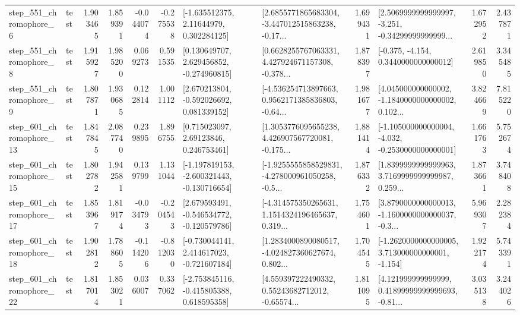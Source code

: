 \begin{tabular}{llrrrrllrlrr}
   step\_551\_chromophore\_6 &      test &      1.903465 &    1.859391 &     -0.044074 & -0.275538 &     [-1.635512375, 2.11644979, 0.302284125] &  [2.6855771865683304, -3.447012515863238, -0.17... &       1.699431 &  [2.5069999999999997, -3.251, -0.34299999999999... &            1.672952 &          2.437871 \\
   step\_551\_chromophore\_8 &      test &      1.915927 &    1.985200 &      0.069273 &  0.591535 &    [0.130649707, 2.629456852, -0.274960815] &  [0.6628255767063331, 4.427924671157308, -0.378... &       1.878397 &               [-0.375, -4.154, 0.3440000000000012] &            2.619850 &          3.345485 \\
   step\_551\_chromophore\_9 &      test &      1.807871 &    1.930685 &      0.122814 &  1.001112 &    [2.670213804, -0.592026692, 0.081339152] &  [-4.536254713897663, 0.9562171385836803, -0.64... &       1.981677 &  [4.045000000000002, -1.1840000000000002, 0.102... &            3.824669 &          7.815220 \\
  step\_601\_chromophore\_13 &      test &      1.847845 &    2.087740 &      0.239895 &  1.896755 &      [0.715023097, 2.69123846, 0.246753461] &  [1.3053776095655238, 4.426907567720081, -0.175... &       1.881414 &  [-1.105000000000004, -4.032, -0.2530000000000001] &            1.661763 &          5.752674 \\
  step\_601\_chromophore\_15 &      test &      1.802782 &    1.942581 &      0.139799 &  1.131044 &  [-1.197819153, -2.600321443, -0.130716654] &  [-1.9255555858529831, -4.278000961050258, -0.5... &       1.876332 &  [1.8399999999999963, 3.7169999999999987, 0.259... &            1.873661 &          3.748408 \\
  step\_601\_chromophore\_17 &      test &      1.853967 &    1.819174 &     -0.034793 & -0.204543 &   [2.679593491, -0.546534772, -0.120579786] &  [-4.314575350265631, 1.1514324196465637, 0.319... &       1.754601 &  [3.8790000000000013, -1.1600000000000037, -0.3... &            5.969307 &          2.282384 \\
  step\_601\_chromophore\_18 &      test &      1.902812 &    1.788605 &     -0.114206 & -0.812030 &   [-0.730044141, 2.414617023, -0.721607184] &  [1.2834000890080517, -4.024827360627674, 0.802... &       1.704545 &   [-1.2620000000000005, 3.713000000000001, -1.154] &            1.922174 &          5.743391 \\
  step\_601\_chromophore\_22 &      test &      1.817014 &    1.853021 &      0.036007 &  0.337062 &   [-2.753845116, -0.415805388, 0.618595358] &  [4.559397222490332, 0.55243682712012, -0.65574... &       1.811095 &  [4.121999999999999, 0.41899999999999693, -0.81... &            3.035138 &          3.244026 \\

\end{tabular}
